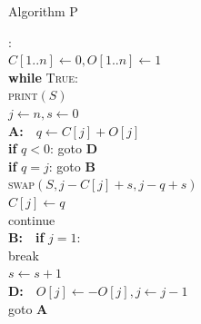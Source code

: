 \documentclass[aspectratio=169]{beamer}
\begin{document}
\begin{frame}{Algorithm P}
\begin{nalgo}[0.95]
:
\\\label{}  $C[1..n] \gets 0, O[1..n] \gets 1$
\\\label{}  \textbf{while} \textsc{True}:\+
\\\label{}      \textsc{print}$(S)$
\\\label{}      $j \gets n, s \gets 0$
\\\label{}      \textbf{A:}~~$q \gets C[j] + O[j]$\+
\\\label{}          \textbf{if} $q < 0$: goto \textbf{D}
\\\label{}          \textbf{if} $q = j$: goto \textbf{B}
\\\label{}          \textsc{swap}$(S, j-C[j]+s, j-q+s)$
\\\label{}          $C[j] \gets q$ 
\\\label{}          continue\-
\\\label{}      \textbf{B:}~~\textbf{if} $j=1$:\+\+
\\\label{}              break\-
\\\label{}          $s \gets s+1$\-
\\\label{}    \textbf{D:}~~$O[j] \gets -O[j], j \gets j-1$\+
\\\label{}      goto \textbf{A}
\end{nalgo}
\end{frame}
\end{document}

